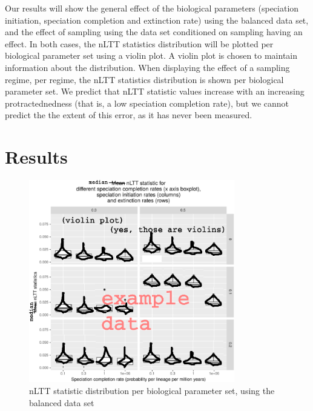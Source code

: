 \documentclass{article}
\begin{document}
Our results will show the general effect of the biological parameters (speciation initiation, 
speciation completion and extinction rate) using the balanced data set,
and the effect of sampling using the data set conditioned on sampling having an effect.
In both cases, the nLTT statistics distribution will be plotted per
biological parameter set using a violin plot. A violin plot is chosen to
maintain information about the distribution. When displaying the effect of a 
sampling regime, per regime, the nLTT statistics distribution is shown per
biological parameter set.
We predict that nLTT statistic values increase 
with an increasing protractednedness (that is, a low speciation completion rate),
but we cannot predict the the extent of this error, as it has never been 
measured.

\section{Results}

\begin{figure}[!htbp]
  \includegraphics[width=0.8\textwidth]{fig_nltt_stats_per_setup.png}
  \caption{
    nLTT statistic distribution per biological parameter set, using the
    balanced data set
  }
\end{figure}
\end{document}
